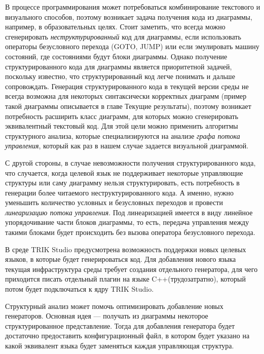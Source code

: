 \documentclass[14pt]{matmex-diploma}
\begin{document}
В процессе программирования может потребоваться
комбинирование текстового и визуального способов, поэтому возникает
задача получения кода из диаграммы, например, в образовательных целях.
Стоит заметить, что всегда можно сгенерировать 
\emph{неструктурированный} код для диаграммы,
если использовать операторы безусловного перехода (GOTO, JUMP) или 
если эмулировать машину состояний, где состояниями будут блоки диаграммы.
Однако получение структурированного кода
для диаграммы является приоритетной задачей, поскольку известно, что
структурированный код легче понимать и дальше сопровождать.
Генерация структурированного кода в текущей версии среды не всегда возможна для 
некоторых синтаксически корректных диаграмм (пример такой диаграммы описывается
в главе Текущие результаты),
поэтому возникает потребность
расширить класс диаграмм, для которых можно сгенерировать
эквивалентный текстовый код. Для этой цели можно применить алгоритмы
структурного анализа,
которые специализируются на анализе \emph{графа потока управления},
который как раз в нашем случае задается визуальной диаграммой.

С другой стороны, в случае невозможности получения структурированного кода,
что случается, когда целевой язык не поддерживает некоторые
управляющие структуры или саму диаграмму нельзя структурировать, 
есть потребность
в генерации более читаемого неструктурированного кода. А именно, нужно
уменьшить
количество условных и безусловных переходов и провести 
\emph{линеаризацию потока управления}.
Под линеаризацией имеется в виду линейное упорядочивание части блоков диаграммы,
то есть, передача управления между такими блоками будет происходить без вызова
оператора безусловного перехода.

В среде TRIK Studio предусмотрена возможность поддержки 
новых целевых языков, в которые будет генерироваться код. 
Для добавления нового языка текущая инфраструктура среды 
требует создания отдельного генератора, для чего 
приходится писать отдельный плагин на языке C++(трудозатратно),
который потом будет подключаться к ядру TRIK Studio.

Структурный анализ может помочь оптимизировать добавление новых генераторов.
Основная идея --- получать из диаграммы некоторое 
структурированное представление.
Тогда для добавления генератора будет достаточно предоставить 
конфигурационный файл, в котором будет указано на какой эквивалент языка будет заменяться
каждая управляющая структура.
\end{document}
